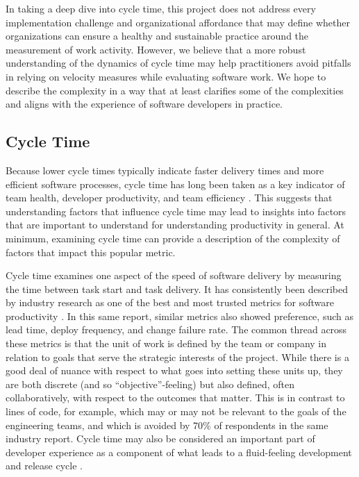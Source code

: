 \documentclass[manuscript,screen,review]{acmart}
\begin{document}
In taking a deep dive into cycle time, this project does not address
every implementation challenge and organizational affordance that may
define whether organizations can ensure a healthy and sustainable
practice around the measurement of work activity. However, we believe
that a more robust understanding of the dynamics of cycle time may help
practitioners avoid pitfalls in relying on velocity measures while
evaluating software work. We hope to describe the complexity in a way
that at least clarifies some of the complexities and aligns with the
experience of software developers in practice.

\subsection{Cycle Time}\label{cycle-time}

Because lower cycle times typically indicate faster delivery times and
more efficient software processes, cycle time has long been taken as a
key indicator of team health, developer productivity, and team
efficiency
\citep{clincySoftwareDevelopmentProductivity2003, agrawalSoftwareEffortQuality2007, carmelCycleTimePackaged1995, eversImprovingEngineeringProductivity1998, guptaKeyDriversReduced1998, nanImpactBudgetSchedule2009, ruvimovaExploratoryStudyProductivity2022, sadowskiRethinkingProductivitySoftware2019, trendowiczChapter6Factors2009}.
This suggests that understanding factors that influence cycle time may
lead to insights into factors that are important to understand for
understanding productivity in general. At minimum, examining cycle time
can provide a description of the complexity of factors that impact this
popular metric.

Cycle time examines one aspect of the speed of software delivery by
measuring the time between task start and task delivery. It has
consistently been described by industry research as one of the best and
most trusted metrics for software productivity
\citep{careyWhy70Engineers2024}. In this same report, similar metrics
also showed preference, such as lead time, deploy frequency, and change
failure rate. The common thread across these metrics is that the unit of
work is defined by the team or company in relation to goals that serve
the strategic interests of the project. While there is a good deal of
nuance with respect to what goes into setting these units up, they are
both discrete (and so ``objective''-feeling) but also defined, often
collaboratively, with respect to the outcomes that matter. This is in
contrast to lines of code, for example, which may or may not be relevant
to the goals of the engineering teams, and which is avoided by 70\% of
respondents in the same industry report. Cycle time may also be
considered an important part of developer experience as a component of
what leads to a fluid-feeling development and release cycle
\citep{greilerActionableFrameworkUnderstanding2022a}.
\end{document}
